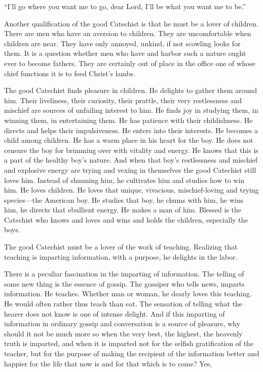 “I’ll go where you want me to go, dear Lord,
I’ll be what you want me to be.”

Another qualification of the good Catechist is that he must be a lover of children. There are men who
have an aversion to children.  They are uncomfortable when children are near. They have only annoyed, unkind, if not scowling looks for them. It is a question whether men who have and harbor such a nature ought ever to become fathers. They are certainly out of place in the office one of whose chief functions it is to feed Christ’s lambs.

The good Catechist finds pleasure in children. He delights to gather them around him. Their liveliness, their curiosity, their prattle, their very restlessness and mischief are sources of unfailing interest to him. He finds joy in studying them, in winning them, in entertaining them. He has patience with their childishness. He directs and helps their impulsiveness. He enters into their interests. He becomes a child among children. He has a warm place in his heart for the boy. He does not censure the boy for brimming over with vitality and energy. He knows that this is a part of the healthy boy’s nature. And when that boy’s restlessness and mischief and explosive energy are trying and vexing in themselves the good Catechist still loves him. Instead of shunning him, he cultivates him and studies how to win him. He loves children. He loves that unique, vivacious, mischief-loving and trying species—the American boy. He studies that boy, he chums with him, he wins him, he directs that ebullient energy. He makes a man of him. Blessed
is the Catechist who knows and loves and wins and holds the children, especially the boys.

 The good Catechist must be a lover of the work of teaching. Realizing that teaching is imparting information, with a purpose, he delights in the labor.

There is a peculiar fascination in the imparting of information. The telling of some new thing is the essence of gossip. The gossiper who tells news, imparts information. He teaches. Whether man or woman, he dearly loves this teaching. He would often rather thus teach than eat. The sensation of telling what the hearer does not know is one of intense delight. And if this imparting of information in ordinary gossip and conversation is a source of pleasure, why should it not be much more so when the very best, the highest, the heavenly truth is imparted, and when it is imparted not for the selfish gratification of the teacher, but for the purpose of making the recipient of the information better and happier for the life that now is and for that which is to come? Yes,

